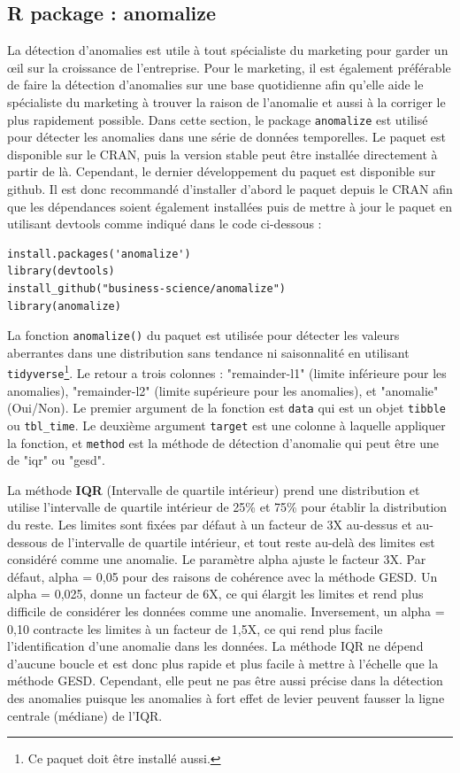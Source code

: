 \subsection{R package : anomalize} La détection d'anomalies est utile à tout spécialiste du marketing pour garder un œil sur la croissance de l'entreprise. Pour le marketing, il est également préférable de faire la détection d'anomalies sur une base quotidienne afin qu'elle aide le spécialiste du marketing à trouver la raison de l'anomalie et aussi à la corriger le plus rapidement possible. Dans cette section, le package \verb|anomalize| est utilisé pour détecter les anomalies dans une série de données temporelles. Le paquet est disponible sur le CRAN, puis la version stable peut être installée directement à partir de là. Cependant, le dernier développement du paquet est disponible sur github. Il est donc recommandé d'installer d'abord le paquet depuis le CRAN afin que les dépendances soient également installées puis de mettre à jour le paquet en utilisant devtools comme indiqué dans le code ci-dessous :
\begin{lstlisting}
install.packages('anomalize')
library(devtools)
install_github("business-science/anomalize")
library(anomalize)
\end{lstlisting}
La fonction \verb|anomalize()| du paquet est utilisée pour détecter les valeurs aberrantes dans une distribution sans tendance ni saisonnalité en utilisant \verb|tidyverse|\footnote{Ce paquet doit être installé aussi.}. Le retour a trois colonnes : "remainder-l1" (limite inférieure pour les anomalies), "remainder-l2" (limite supérieure pour les anomalies), et "anomalie" (Oui/Non). Le premier argument de la fonction est \verb|data| qui est un objet \verb|tibble| ou \verb|tbl_time|. Le deuxième argument \verb|target| est une colonne à laquelle appliquer la fonction, et \verb|method| est la méthode de détection d'anomalie qui peut être une de "iqr" ou "gesd". 
\par La méthode \textbf{IQR} (Intervalle de quartile intérieur) prend une distribution et utilise l'intervalle de quartile intérieur de 25\% et 75\% pour établir la distribution du reste. Les limites sont fixées par défaut à un facteur de 3X au-dessus et au-dessous de l'intervalle de quartile intérieur, et tout reste au-delà des limites est considéré comme une anomalie. Le paramètre alpha ajuste le facteur 3X. Par défaut, alpha = 0,05 pour des raisons de cohérence avec la méthode GESD. Un alpha = 0,025, donne un facteur de 6X, ce qui élargit les limites et rend plus difficile de considérer les données comme une anomalie. Inversement, un alpha = 0,10 contracte les limites à un facteur de 1,5X, ce qui rend plus facile l'identification d'une anomalie dans les données. La méthode IQR ne dépend d'aucune boucle et est donc plus rapide et plus facile à mettre à l'échelle que la méthode GESD. Cependant, elle peut ne pas être aussi précise dans la détection des anomalies puisque les anomalies à fort effet de levier peuvent fausser la ligne centrale (médiane) de l'IQR.

